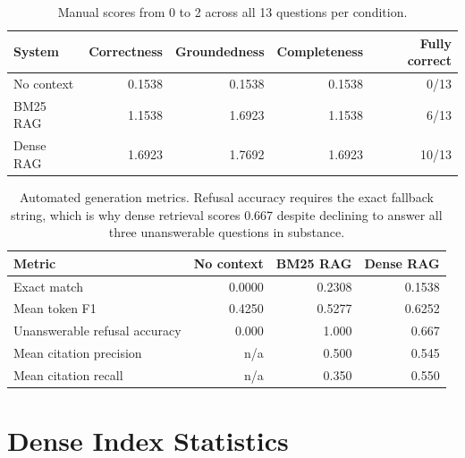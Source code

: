 \documentclass[10pt,a4paper]{article}
\begin{document}
\begin{table}[h]
\centering
\small
\begin{tabular}{lrrrr}
\toprule
System & Correctness & Groundedness & Completeness & Fully correct \\
\midrule
No context & 0.1538 & 0.1538 & 0.1538 & 0/13 \\
BM25 RAG & 1.1538 & 1.6923 & 1.1538 & 6/13 \\
Dense RAG & 1.6923 & 1.7692 & 1.6923 & 10/13 \\
\bottomrule
\end{tabular}
\caption{Manual scores from 0 to 2 across all 13 questions per condition.}
\label{tab:generation}
\end{table}

\begin{table}[h]
\centering
\small
\begin{tabular}{lrrr}
\toprule
Metric & No context & BM25 RAG & Dense RAG \\
\midrule
Exact match & 0.0000 & 0.2308 & 0.1538 \\
Mean token F1 & 0.4250 & 0.5277 & 0.6252 \\
Unanswerable refusal accuracy & 0.000 & 1.000 & 0.667 \\
Mean citation precision & n/a & 0.500 & 0.545 \\
Mean citation recall & n/a & 0.350 & 0.550 \\
\bottomrule
\end{tabular}
\caption{Automated generation metrics. Refusal accuracy requires the exact fallback string, which is why dense retrieval scores 0.667 despite declining to answer all three unanswerable questions in substance.}
\label{tab:autogen}
\end{table}

\section{Dense Index Statistics}
\label{app:stats}
\end{document}
